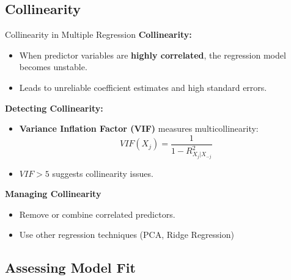 \documentclass[aspectratio=169,xcolor=dvipsnames]{beamer}
\begin{document}

\subsection{Collinearity}
\begin{frame}{Collinearity in Multiple Regression}
    \textbf{Collinearity:}
    \begin{itemize}
        \item When predictor variables are \textbf{highly correlated}, the regression model becomes unstable.
        \item Leads to unreliable coefficient estimates and high standard errors.
    \end{itemize}

    \bigskip

    \textbf{Detecting Collinearity:}
    \begin{itemize}
        \item \textbf{Variance Inflation Factor (VIF)} measures multicollinearity:
        \begin{equation}
            VIF(X_j) = \frac{1}{1 - R^2_{X_j | X_{-j}}}
        \end{equation}
        \item \( VIF > 5 \) suggests collinearity issues.
    \end{itemize}

    \bigskip

    \textbf{Managing Collinearity}
    \begin{itemize}
        \item Remove or combine correlated predictors.
        \item Use other regression techniques (PCA, Ridge Regression)
    \end{itemize}
\end{frame}

\subsection{Assessing Model Fit}
\end{document}
